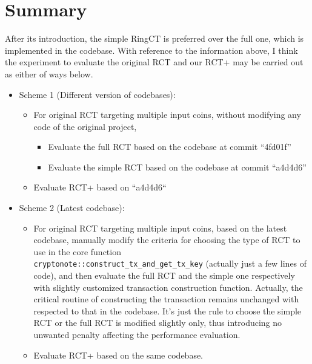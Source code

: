 \documentclass[a4paper,10pt]{article}
\begin{document}
\section{Summary}
After its introduction, the simple RingCT is preferred over the full one, which is implemented in the codebase. With reference to the information above, I think the experiment to evaluate the original RCT and our RCT+ may be carried out as either of ways below.
	\begin{itemize}
		\item Scheme 1 (Different version of codebases): 
			\begin{itemize}
				\item For original RCT targeting multiple input coins, without modifying any code of the original project,
					\begin{itemize}
						\item Evaluate the full RCT based on the codebase at commit ``4fd01f''
						\item Evaluate the simple RCT based on the codebase at commit ``a4d4d6''
					\end{itemize}
				\item Evaluate RCT+ based on ``a4d4d6``
			\end{itemize}
		\item Scheme 2 (Latest codebase):
			\begin{itemize}
				\item For original RCT targeting multiple input coins, based on the latest codebase, manually modify the criteria for choosing the type of RCT to use in the core function \\
					\texttt{cryptonote::construct\_tx\_and\_get\_tx\_key} (actually just a few lines of code), and then evaluate the full RCT and the simple one respectively with slightly customized transaction construction function. Actually, the critical routine of constructing the transaction remains unchanged with respected to that in the codebase. It's just the rule to choose the simple RCT or the full RCT is modified slightly only, thus introducing no unwanted penalty affecting the performance evaluation.
				\item Evaluate RCT+ based on the same codebase.
			\end{itemize}
	\end{itemize}
\end{document}
